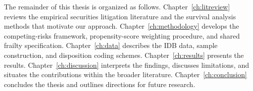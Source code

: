 The remainder of this thesis is organized as follows.
Chapter~\ref{ch:litreview} reviews the empirical securities
litigation literature and the survival analysis methods that
motivate our approach. Chapter~\ref{ch:methodology} develops
the competing-risks framework, propensity-score weighting
procedure, and shared frailty specification.
Chapter~\ref{ch:data} describes the IDB data, sample
construction, and disposition coding schemes.
Chapter~\ref{ch:results} presents the results.
Chapter~\ref{ch:discussion} interprets the findings,
discusses limitations, and situates the contributions within
the broader literature. Chapter~\ref{ch:conclusion} concludes
the thesis and outlines directions for future research.
